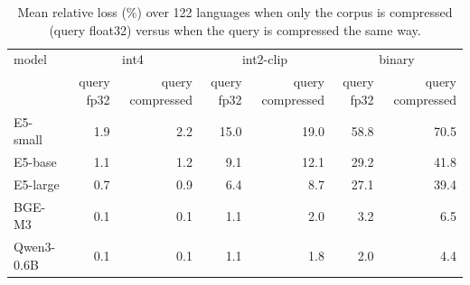 \begin{table}[t]\centering\footnotesize
\begin{tabular}{lrrrrrr}
\toprule
model & \multicolumn{2}{c}{int4} & \multicolumn{2}{c}{int2-clip} & \multicolumn{2}{c}{binary} \\
 & query fp32 & query compressed & query fp32 & query compressed & query fp32 & query compressed \\
\midrule
E5-small & 1.9 & 2.2 & 15.0 & 19.0 & 58.8 & 70.5 \\
E5-base & 1.1 & 1.2 & 9.1 & 12.1 & 29.2 & 41.8 \\
E5-large & 0.7 & 0.9 & 6.4 & 8.7 & 27.1 & 39.4 \\
BGE-M3 & 0.1 & 0.1 & 1.1 & 2.0 & 3.2 & 6.5 \\
Qwen3-0.6B & 0.1 & 0.1 & 1.1 & 1.8 & 2.0 & 4.4 \\
\bottomrule
\end{tabular}
\caption{Mean relative loss (\%) over 122 languages when only the corpus is compressed (query float32) versus when the query is compressed the same way.}\label{tab:sym}
\end{table}
